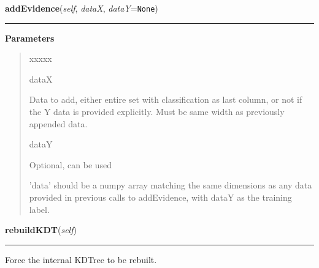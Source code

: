 \hspace{.8\funcindent}\begin{boxedminipage}{\funcwidth}

    \raggedright \textbf{addEvidence}(\textit{self}, \textit{dataX}, \textit{dataY}={\tt None})

    \vspace{-1.5ex}

    \rule{\textwidth}{0.5\fboxrule}
\setlength{\parskip}{2ex}
\setlength{\parskip}{1ex}
      \textbf{Parameters}
      \vspace{-1ex}

      \begin{quote}
        \begin{Ventry}{xxxxx}

          \item[dataX]

          Data to add, either entire set with classification as last 
          column, or not if the Y data is provided explicitly.  Must be 
          same width as previously appended data.

          \item[dataY]

          Optional, can be used

          'data' should be a numpy array matching the same dimensions as 
          any data provided in previous calls to addEvidence, with dataY as
          the training label.

        \end{Ventry}

      \end{quote}

    \end{boxedminipage}

    \label{QSTK:qstklearn:kdtknn:kdtknn:rebuildKDT}

    \vspace{0.5ex}

\hspace{.8\funcindent}\begin{boxedminipage}{\funcwidth}

    \raggedright \textbf{rebuildKDT}(\textit{self})

    \vspace{-1.5ex}

    \rule{\textwidth}{0.5\fboxrule}
\setlength{\parskip}{2ex}
    Force the internal KDTree to be rebuilt.

\setlength{\parskip}{1ex}
    \end{boxedminipage}

